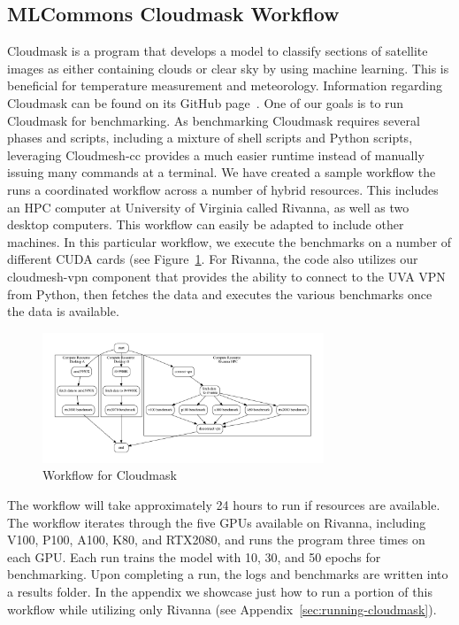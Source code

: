 
\subsection{MLCommons Cloudmask Workflow}
\label{cloudmask-workflow}

Cloudmask is a program that develops a model to classify sections of
satellite images as either containing clouds or clear sky by using
machine learning. This is beneficial for temperature measurement and
meteorology.  Information regarding Cloudmask can be found on its
GitHub page~\cite{www-cloudmask}.  One of our goals is to run
Cloudmask for benchmarking.  As benchmarking Cloudmask requires
several phases and scripts, including a mixture of shell scripts and
Python scripts, leveraging Cloudmesh-cc provides a much easier runtime
instead of manually issuing many commands at a terminal.  We have
created a sample workflow the runs a coordinated workflow across a
number of hybrid resources. This includes an HPC computer at
University of Virginia called Rivanna, as well as two desktop
computers. This workflow can easily be adapted to include other machines. In this
particular workflow, we execute the benchmarks on a number of
different CUDA cards (see Figure~\ref{fig:cloudmaskwf}. For Rivanna,
the code also utilizes our cloudmesh-vpn component that provides the
ability to connect to the UVA VPN from Python, then fetches the data
and executes the various benchmarks once the data is available.

\begin{figure}[htb]
\centering
\includegraphics[width=0.75\textwidth]{images/cloudmask-wf.pdf}
\caption{Workflow for Cloudmask}\label{fig:cloudmaskwf}
\end{figure}

The workflow will take approximately 24 hours to run if resources are
available. The workflow iterates through the five GPUs available on
Rivanna, including V100, P100, A100, K80, and RTX2080, and runs the program
three times on each GPU. Each run trains the model with 10, 30, and 50
epochs for benchmarking. Upon completing a run, the logs and
benchmarks are written into a results folder.
In the appendix we showcase just how to run a portion of this workflow
while utilizing only Rivanna (see Appendix~\ref{sec:running-cloudmask}).


